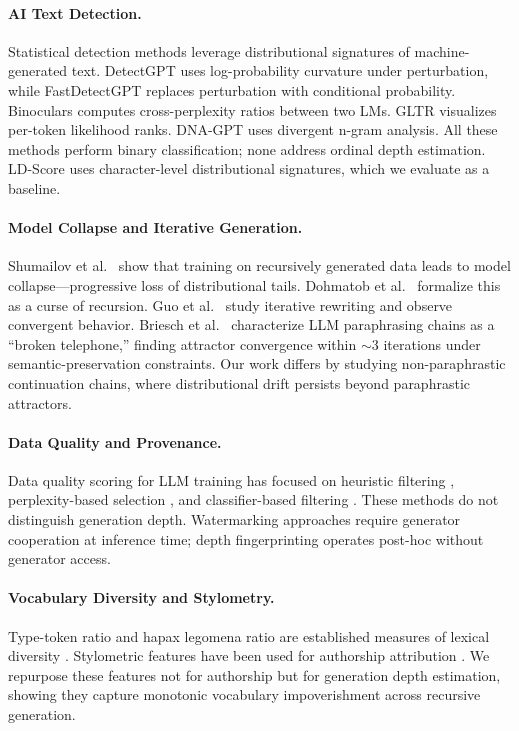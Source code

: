\documentclass[11pt]{article}
\begin{document}
\paragraph{AI Text Detection.}
Statistical detection methods leverage distributional signatures of machine-generated text. DetectGPT \cite{mitchell2023detectgpt} uses log-probability curvature under perturbation, while FastDetectGPT \cite{bao2024fastdetectgpt} replaces perturbation with conditional probability. Binoculars \cite{hans2024binoculars} computes cross-perplexity ratios between two LMs. GLTR \cite{gehrmann2019gltr} visualizes per-token likelihood ranks. DNA-GPT \cite{yang2023dnagpt} uses divergent n-gram analysis. All these methods perform binary classification; none address ordinal depth estimation. LD-Score \cite{wu2025ldscore} uses character-level distributional signatures, which we evaluate as a baseline.

\paragraph{Model Collapse and Iterative Generation.}
Shumailov et al.\ \cite{shumailov2024modelcollapse} show that training on recursively generated data leads to model collapse---progressive loss of distributional tails. Dohmatob et al.\ \cite{dohmatob2024tale} formalize this as a curse of recursion. Guo et al.\ \cite{guo2024curious} study iterative rewriting and observe convergent behavior. Briesch et al.\ \cite{briesch2025broken} characterize LLM paraphrasing chains as a ``broken telephone,'' finding attractor convergence within $\sim$3 iterations under semantic-preservation constraints. Our work differs by studying non-paraphrastic continuation chains, where distributional drift persists beyond paraphrastic attractors.

\paragraph{Data Quality and Provenance.}
Data quality scoring for LLM training has focused on heuristic filtering \cite{penedo2024fineweb}, perplexity-based selection \cite{wenzek2020ccnet}, and classifier-based filtering \cite{brown2020language}. These methods do not distinguish generation depth. Watermarking approaches \cite{kirchenbauer2023watermark} require generator cooperation at inference time; depth fingerprinting operates post-hoc without generator access.

\paragraph{Vocabulary Diversity and Stylometry.}
Type-token ratio and hapax legomena ratio are established measures of lexical diversity \cite{tweedie1998variable}. Stylometric features have been used for authorship attribution \cite{koppel2009computational}. We repurpose these features not for authorship but for generation depth estimation, showing they capture monotonic vocabulary impoverishment across recursive generation.
\end{document}
